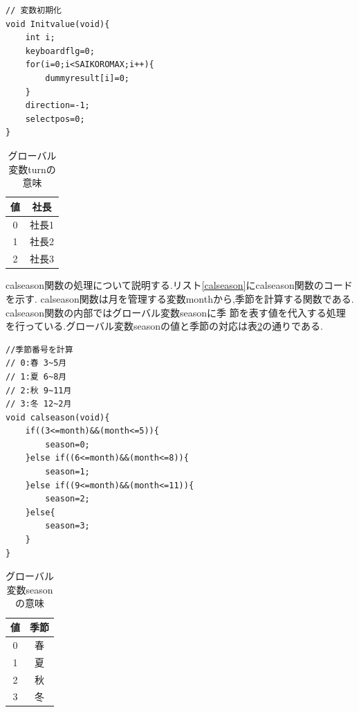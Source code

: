\documentclass[a4j]{jarticle}
\begin{document}
    \begin{lstlisting}[basicstyle=\ttfamily\footnotesize, frame=single,label=Initvalue,caption=Initvalue関数]
// 変数初期化
void Initvalue(void){
    int i;
    keyboardflg=0;
    for(i=0;i<SAIKOROMAX;i++){
        dummyresult[i]=0;
    }
    direction=-1;
    selectpos=0;
}
    \end{lstlisting} 

    \begin{table}[H]
        \caption{グローバル変数turnの意味}
      \label{whoturn}
      \begin{center}
          \begin{tabular}{c|c}\hline
           値 & 社長 \\ \hline \hline
            0 & 社長1 \\
            1 & 社長2 \\
            2 & 社長3 \\ \hline
          \end{tabular}
      \end{center}
      \end{table}

    calseason関数の処理について説明する.リスト\ref{calseason}にcalseason関数のコードを示す.
    calseason関数は月を管理する変数monthから,季節を計算する関数である. calseason関数の内部ではグローバル変数seasonに季
    節を表す値を代入する処理を行っている.グローバル変数seasonの値と季節の対応は表\ref{whoseason}の通りである.\\
    \begin{lstlisting}[basicstyle=\ttfamily\footnotesize, frame=single,label=calseason,caption=calseason関数]
//季節番号を計算
// 0:春 3~5月
// 1:夏 6~8月
// 2:秋 9~11月
// 3:冬 12~2月
void calseason(void){
    if((3<=month)&&(month<=5)){
        season=0;
    }else if((6<=month)&&(month<=8)){
        season=1;
    }else if((9<=month)&&(month<=11)){
        season=2;
    }else{
        season=3;
    }
} 
    \end{lstlisting} 

   \begin{table}[H]
    \caption{グローバル変数seasonの意味}
  \label{whoseason}
  \begin{center}
      \begin{tabular}{c|c}\hline
       値 & 季節 \\ \hline \hline
       0 & 春 \\
       1 & 夏 \\ 
       2 & 秋 \\ 
       3 & 冬 \\ \hline
      \end{tabular}
  \end{center}
  \end{table}
\end{document}
